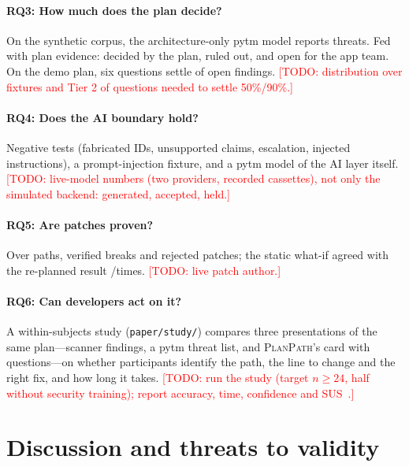 \documentclass[sigconf,review,anonymous]{acmart}
\newcommand{\sys}{\textsc{PlanPath}\xspace}   %
\newcommand{\todo}[1]{\textcolor{red}{[TODO: #1]}}
\begin{document}
\paragraph{RQ3: How much does the plan decide?} On the synthetic corpus, the architecture-only pytm model reports
\NumTOnePytmOnly threats. Fed with plan evidence: \NumTOnePytmDecided decided by the plan, \NumTOnePytmRuledOut ruled out, and
\NumTOnePytmAppTeam open for the app team. On the demo plan, six questions settle \NumDemoSixSettle of \NumDemoOpen open
findings. \todo{distribution over fixtures and Tier 2 of questions needed to settle 50\%/90\%.}

\paragraph{RQ4: Does the AI boundary hold?} Negative tests (fabricated IDs, unsupported claims, escalation, injected
instructions), a prompt-injection fixture, and a pytm model of the AI layer itself. \todo{live-model numbers (two providers,
recorded cassettes), not only the simulated backend: \NumTOneAIGenerated generated, \NumTOneAIAccepted accepted,
\NumTOneAIHeld held.}

\paragraph{RQ5: Are patches proven?} Over \NumTOneRemPaths paths, \NumTOneRemBreak verified breaks and \NumTOneRemRejected
rejected patches; the static what-if agreed with the re-planned result \NumTOneRemWhatIfAgree/\NumTOneRemWhatIfChecked times.
\todo{live patch author.}

\paragraph{RQ6: Can developers act on it?} A within-subjects study (\texttt{paper/study/}) compares three presentations of
the same plan---scanner findings, a pytm threat list, and \sys's card with questions---on whether participants identify the
path, the line to change and the right fix, and how long it takes. \todo{run the study (target $n \ge 24$, half without
security training); report accuracy, time, confidence and SUS~\cite{brooke1996sus}.}

\section{Discussion and threats to validity}
\end{document}
